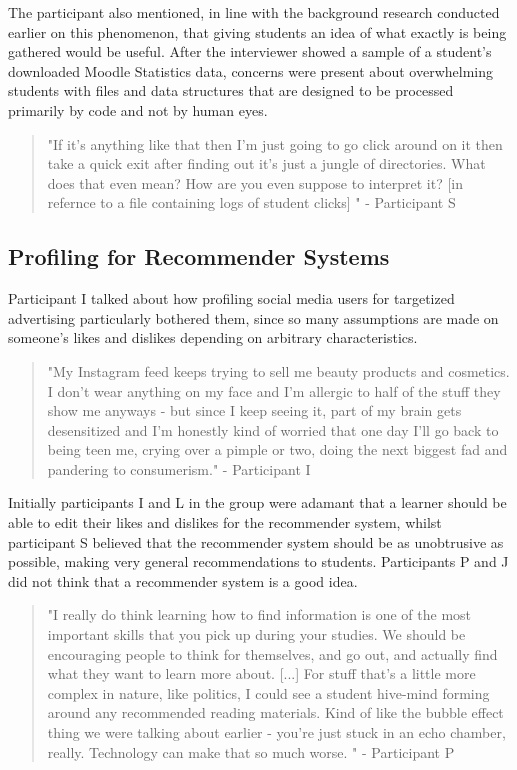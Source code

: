 \documentclass{l4proj}
\begin{document}
The participant also mentioned, in line with the background research conducted earlier on this phenomenon, that giving students an idea of what exactly is being gathered would be useful. After the interviewer showed a sample of a student's downloaded Moodle Statistics data, concerns were present about overwhelming students with files and data structures that are designed to be processed primarily by code and not by human eyes.

\begin{quote}
    "If it's anything like that then I'm just going to go click around on it then take a quick exit after finding out it's just a jungle of directories. What does that even mean? How are you even suppose to interpret it? [in refernce to a file containing logs of student clicks] " - Participant S
\end{quote}

\subsection{Profiling for Recommender Systems}
Participant I talked about how profiling social media users for targetized advertising particularly bothered them, since so many assumptions are made on someone's likes and dislikes depending on arbitrary characteristics.

\begin{quote}
    "My Instagram feed keeps trying to sell me beauty products and cosmetics. I don't wear anything on my face and I'm allergic to half of the stuff they show me anyways - but since I keep seeing it, part of my brain gets desensitized and I'm honestly kind of worried that one day I'll go back to being teen me, crying over a pimple or two, doing the next biggest fad and pandering to consumerism." - Participant I
\end{quote}

Initially participants I and L in the group were adamant that a learner should be able to edit their likes and dislikes for the recommender system, whilst participant S believed that the recommender system should be as unobtrusive as possible, making very general recommendations to students. Participants P and J did not think that a recommender system is a good idea.

\begin{quote}
    "I really do think learning how to find information is one of the most important skills that you pick up during your studies. We should be encouraging people to think for themselves, and go out, and actually find what they want to learn more about. [...] For stuff that's a little more complex in nature, like politics, I could see a student hive-mind forming around any recommended reading materials. Kind of like the bubble effect thing we were talking about earlier - you're just stuck in an echo chamber, really. Technology can make that so much worse. " - Participant P
\end{quote}
\end{document}

